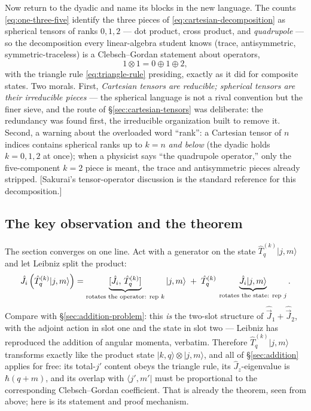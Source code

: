 \documentclass[11pt]{article}
\theoremstyle{plain}
\theoremstyle{definition}
\theoremstyle{remark}
\newcommand{\op}[1]{\hat{#1}}
\newcommand{\ket}[1]{\lvert #1 \rangle}
\newcommand{\bra}[1]{\langle #1 \rvert}
\begin{document}
Now return to the dyadic and name its blocks in the new language.
The counts \eqref{eq:one-three-five} identify the three pieces of
\eqref{eq:cartesian-decomposition} as spherical tensors of ranks
$0, 1, 2$ --- dot product, cross product, and \emph{quadrupole} ---
so the decomposition every linear-algebra student knows (trace,
antisymmetric, symmetric-traceless) is a Clebsch--Gordan statement
about operators,
\begin{equation}
  1 \otimes 1 = 0 \oplus 1 \oplus 2,
\end{equation}
with the triangle rule \eqref{eq:triangle-rule} presiding, exactly
as it did for composite states. Two morals. First, \emph{Cartesian
tensors are reducible; spherical tensors are their irreducible
pieces} --- the spherical language is not a rival convention but
the finer sieve, and the route of
\S\ref{sec:cartesian-tensors} was deliberate: the redundancy was
found first, the irreducible organization built to remove it.
Second, a warning about the overloaded word ``rank'': a Cartesian
tensor of $n$ indices contains spherical ranks up to $k = n$
\emph{and below} (the dyadic holds $k = 0, 1, 2$ at once); when a
physicist says ``the quadrupole operator,'' only the five-component
$k = 2$ piece is meant, the trace and antisymmetric pieces
already stripped. [Sakurai's tensor-operator discussion is the
standard reference for this decomposition.]


\subsection{The key observation and the theorem}
\label{sec:WE-theorem}

The section converges on one line. Act with a generator on the
state $\op T^{(k)}_q\ket{j, m}$ and let Leibniz split the product:
\begin{equation}
  \op J_i\,\Bigl(\op T^{(k)}_q\ket{j, m}\Bigr)
  = \underbrace{[\op J_i,\, \op T^{(k)}_q]}_{\text{rotates the
    operator: rep } k}\,\ket{j, m}
  \;+\;
  \op T^{(k)}_q\,
  \underbrace{\op J_i\ket{j, m}}_{\text{rotates the state: rep }
    j} .
  \label{eq:leibniz-two-slot}
\end{equation}
Compare with \S\ref{sec:addition-problem}: this \emph{is} the
two-slot structure of $\op{\vec J}_1 + \op{\vec J}_2$, with the
adjoint action in slot one and the state in slot two --- Leibniz
has reproduced the addition of angular momenta, verbatim. Therefore
$\op T^{(k)}_q\ket{j, m}$ transforms exactly like the product state
$\ket{k, q}\otimes\ket{j, m}$, and all of \S\ref{sec:addition}
applies for free: its total-$j'$ content obeys the triangle rule,
its $\op J_z$-eigenvalue is $\hbar(q + m)$, and its overlap with
$\bra{j', m'}$ must be proportional to the corresponding
Clebsch--Gordan coefficient. That is already the theorem, seen from
above; here is its statement and proof mechanism.
\end{document}

